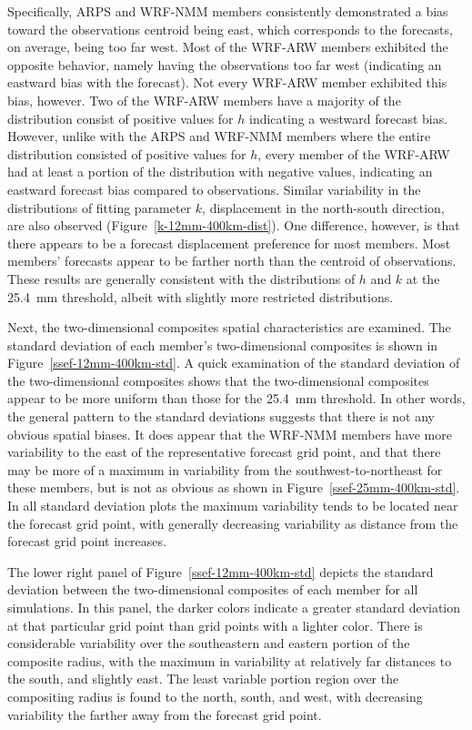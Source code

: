 Specifically, ARPS and WRF-NMM members consistently demonstrated a bias toward the observations centroid being east, which corresponds to the forecasts, on average, being too far west.
Most of the WRF-ARW members exhibited the opposite behavior, namely having the observations too far west (indicating an eastward bias with the forecast).
Not every WRF-ARW member exhibited this bias, however.
Two of the WRF-ARW members have a majority of the distribution consist of positive values for $h$ indicating a westward forecast bias.
However, unlike with the ARPS and WRF-NMM members where the entire distribution consisted of positive values for $h$, every member of the WRF-ARW had at least a portion of the distribution with negative values, indicating an eastward forecast bias compared to observations.
Similar variability in the distributions of fitting parameter $k$, displacement in the north-south direction, are also observed (\mbox{Figure \ref{k-12mm-400km-dist}}).
One difference, however, is that there appears to be a forecast displacement preference for most members.
Most members' forecasts appear to be farther north than the centroid of observations.
These results are generally consistent with the distributions of $h$ and $k$ at the \mbox{25.4 mm} threshold, albeit with slightly more restricted distributions.


Next, the two-dimensional composites spatial characteristics are examined.
The standard deviation of each member's two-dimensional composites is shown in \mbox{Figure \ref{ssef-12mm-400km-std}}.
A quick examination of the standard deviation of the two-dimensional composites shows that the two-dimensional composites appear to be more uniform than those for the \mbox{25.4 mm} threshold.
In other words, the general pattern to the standard deviations suggests that there is not any obvious spatial biases.
It does appear that the WRF-NMM members have more variability to the east of the representative forecast grid point, and that there may be more of a maximum in variability from the southwest-to-northeast for these members, but is not as obvious as shown in \mbox{Figure \ref{ssef-25mm-400km-std}}.
In all standard deviation plots the maximum variability tends to be located near the forecast grid point, with generally decreasing variability as distance from the forecast grid point increases.


The lower right panel of \mbox{Figure \ref{ssef-12mm-400km-std}} depicts the standard deviation between the two-dimensional composites of each member for all simulations.
In this panel, the darker colors indicate a greater standard deviation at that particular grid point than grid points with a lighter color.
There is considerable variability over the southeastern and eastern portion of the composite radius, with the maximum in variability at relatively far distances to the south, and slightly east.
The least variable portion region over the compositing radius is found to the north, south, and west, with decreasing variability the farther away from the forecast grid point.


